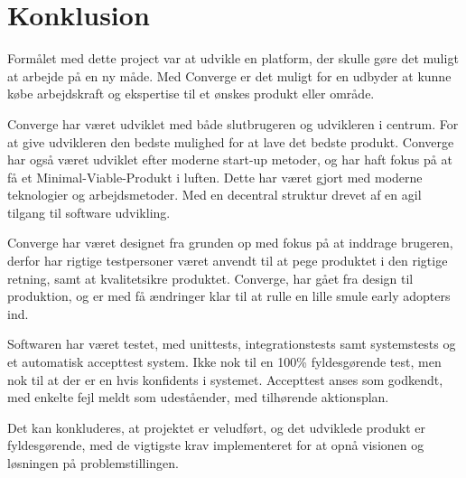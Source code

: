 \chapter{Konklusion}
\label{cha:conclusion}

Formålet med dette project var at udvikle en platform, der skulle gøre det muligt at arbejde på en ny måde. Med Converge er det muligt for en udbyder at kunne købe arbejdskraft og ekspertise til et ønskes produkt eller område.

Converge har været udviklet med både slutbrugeren og udvikleren i centrum. For at give udvikleren den bedste mulighed for at lave det bedste produkt. Converge har også været udviklet efter moderne start-up metoder, og har haft fokus på at få et Minimal-Viable-Produkt i luften. Dette har været gjort med moderne teknologier og arbejdsmetoder. Med en decentral struktur drevet af en agil tilgang til software udvikling.

Converge har været designet fra grunden op med fokus på at inddrage brugeren, derfor har rigtige testpersoner været anvendt til at pege produktet i den rigtige retning, samt at kvalitetsikre produktet. Converge, har gået fra design til produktion, og er med få ændringer klar til at rulle en lille smule early adopters ind.

Softwaren har været testet, med unittests, integrationstests samt systemstests og et automatisk accepttest system. Ikke nok til en 100\% fyldesgørende test, men nok til at der er en hvis konfidents i systemet. Accepttest anses som godkendt, med enkelte fejl meldt som udeståender, med tilhørende aktionsplan.

Det kan konkluderes, at projektet er veludført, og det udviklede produkt er fyldesgørende, med de vigtigste krav implementeret for at opnå visionen og løsningen på problemstillingen.


